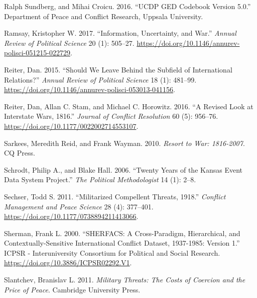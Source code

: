\documentclass{article}
\newlength{\cslhangindent}
\newlength{\cslentryspacingunit} %
\newenvironment{CSLReferences}[2] %
 {%
  \setlength{\parindent}{0pt}
  \ifodd #1
  \let\oldpar\par
  \def\par{\hangindent=\cslhangindent\oldpar}
  \fi
  \setlength{\parskip}{#2\cslentryspacingunit}
 }%
 {}
\begin{document}
\begin{CSLReferences}{1}{0}
\leavevmode{}%
Ralph Sundberg, and Mihai Croicu. 2016. {``{UCDP GED Codebook} Version
5.0.''} {Department of Peace and Conflict Research, Uppsala University}.

\leavevmode{}%
Ramsay, Kristopher W. 2017. {``Information, {Uncertainty}, and {War}.''}
\emph{Annual Review of Political Science} 20 (1): 505--27.
\url{https://doi.org/10.1146/annurev-polisci-051215-022729}.

\leavevmode{}%
Reiter, Dan. 2015. {``Should {We Leave Behind} the {Subfield} of
{International Relations}?''} \emph{Annual Review of Political Science}
18 (1): 481--99.
\url{https://doi.org/10.1146/annurev-polisci-053013-041156}.

\leavevmode{}%
Reiter, Dan, Allan C. Stam, and Michael C. Horowitz. 2016. {``A {Revised
Look} at {Interstate Wars}, 1816.''} \emph{Journal of
Conflict Resolution} 60 (5): 956--76.
\url{https://doi.org/10.1177/0022002714553107}.

\leavevmode{}%
Sarkees, Meredith Reid, and Frank Wayman. 2010. \emph{Resort to War:
1816-2007}. {CQ Press}.

\leavevmode{}%
Schrodt, Philip A., and Blake Hall. 2006. {``Twenty Years of the
{Kansas} Event Data System Project.''} \emph{The Political
Methodologist} 14 (1): 2--8.

\leavevmode{}%
Sechser, Todd S. 2011. {``Militarized {Compellent Threats},
1918.''} \emph{Conflict Management and Peace Science} 28
(4): 377--401. \url{https://doi.org/10.1177/0738894211413066}.

\leavevmode{}%
Sherman, Frank L. 2000. {``{SHERFACS}: {A Cross-Paradigm},
{Hierarchical}, and {Contextually-Sensitive International Conflict
Dataset}, 1937-1985: {Version} 1.''} {ICPSR - Interuniversity Consortium
for Political and Social Research}.
\url{https://doi.org/10.3886/ICPSR02292.V1}.

\leavevmode{}%
Slantchev, Branislav L. 2011. \emph{Military Threats: The Costs of
Coercion and the Price of Peace}. {Cambridge University Press}.


\end{CSLReferences}
\end{document}
